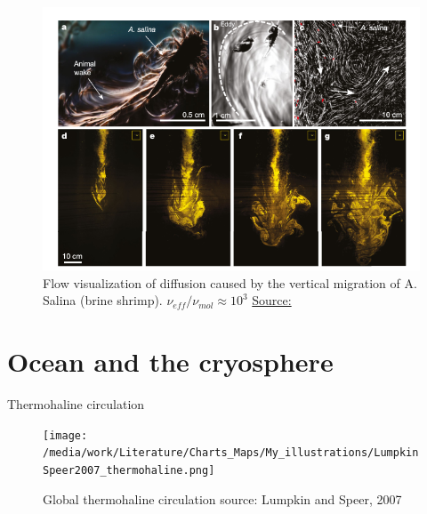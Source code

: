 \documentclass{beamer}
\begin{document}
\begin{frame}
\begin{figure}
\includegraphics[width=\linewidth]{./Images/Swimmer_Visualization.png}
\caption{\label{fig:SwimmerDiffusion} Flow visualization of diffusion caused by the vertical migration of A. Salina (brine shrimp). $\nu_{eff} / \nu_{mol} \approx 10^3$ \href{https://www.nature.com/articles/s41586-018-0044-z}{\tiny Source: \citep{houghton2018SwimmerDiffusion} }}
\end{figure}
\end{frame}



\section{Ocean and the cryosphere}

\begin{frame}{Thermohaline circulation}
\begin{figure}
\captionsetup[figure]{font=scriptsize,labelfont=scriptsize}
\captionsetup[subfigure]{font=scriptsize,labelfont=scriptsize}
\centering
\texttt{[image: /media/work/Literature/Charts\_Maps/My\_illustrations/LumpkinSpeer2007\_thermohaline.png]}
\caption{\label{fig:LumpkinSpeer2007} Global thermohaline circulation {\tiny source: Lumpkin and Speer, 2007 \citep{lumpkin2007global}}}
\end{figure}
\end{frame}
\end{document}
